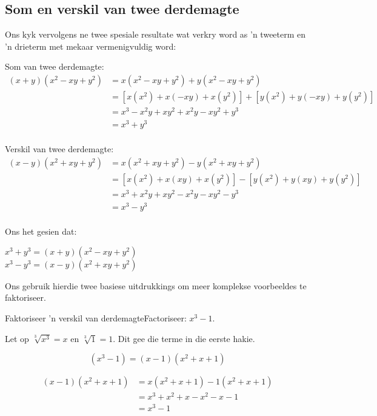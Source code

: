 \subsection*{Som en verskil van twee derdemagte}      
Ons kyk vervolgens ne twee spesiale resultate wat verkry word as 'n tweeterm en 'n drieterm met mekaar vermenigvuldig word:

Som van twee derdemagte:
\begin{align*}
  (x+y)({x}^{2}-xy+{y}^{2}) &= x({x}^{2}-xy+{y}^{2})+y({x}^{2}- xy+{y}^{2})\\
  &= \left[x({x}^{2})+x(-xy)+x({y}^{2})\right]+\left[y({x}^{2})+y(-xy)+y({y}^{2})\right]\\
  &= {x}^{3}-{x}^{2}y+x{y}^{2}+{x}^{2}y-x{y}^{2}+{y}^{3} \\
  &= {x}^{3}+{y}^{3}\\
\end{align*}

\par
Verskil van twee derdemagte:
\begin{align*}
(x-y)({x}^{2}+xy+{y}^{2}) &= x({x}^{2}+xy+{y}^{2})-y({x}^{2}+ xy+{y}^{2})\\
  &= \left[x({x}^{2})+x(xy)+x({y}^{2})\right]-\left[y({x}^{2})+y(xy)+y({y}^{2})\right]\\
  &= {x}^{3}+{x}^{2}y+x{y}^{2}-{x}^{2}y-x{y}^{2}-{y}^{3} \\
  &= {x}^{3}-{y}^{3}\\
\end{align*}

Ons het gesien dat:
\begin{center}
${x}^{3}+{y}^{3}=(x+y)({x}^{2}-xy+{y}^{2})$\\
${x}^{3}-{y}^{3}=(x-y)({x}^{2}+xy+{y}^{2})$\\
\end{center}
\par
Ons gebruik hierdie twee basiese uitdrukkings om meer komplekse voorbeeldes te faktoriseer.


\begin{wex}{Faktoriseer 'n verskil van derdemagte}{Factoriseer: $x^{3} - 1$.}
{
Let op $\sqrt[3]{x^{3}} = x$ en $\sqrt[3]{1} = 1$. Dit gee die terme in die eerste hakie.

\begin{equation*}
  (x^{3} - 1) = (x-1)(x^{2}+x+1)
\end{equation*}

\begin{align*}
  (x-1)(x^{2}+x+1) &= x(x^{2}+x+1)-1(x^{2}+x+1)\\
		   &=x^{3}+x^{2}+x-x^{2}-x-1\\
		   &=x^{3}-1\\
\end{align*}
}
\end{wex}

